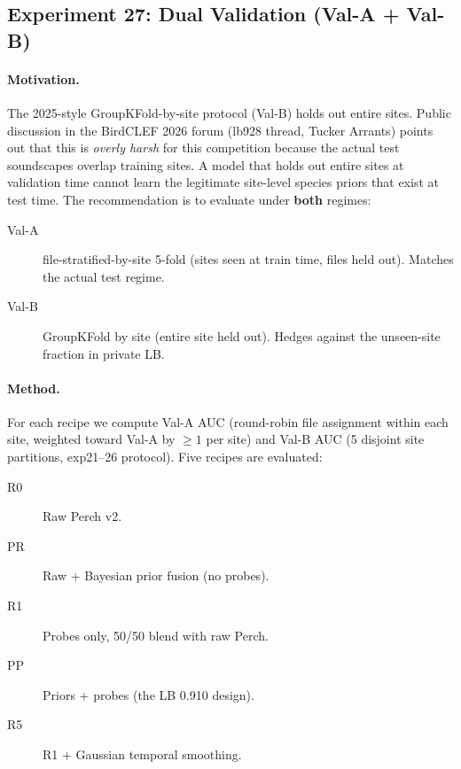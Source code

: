 \subsection{Experiment 27: Dual Validation (Val-A + Val-B)}
\label{sec:exp27}

\paragraph{Motivation.} The 2025-style GroupKFold-by-site protocol
(Val-B) holds out entire sites. Public discussion in the BirdCLEF
2026 forum (lb928 thread, Tucker Arrants) points out that this is
\textit{overly harsh} for this competition because the actual test
soundscapes overlap training sites. A model that holds out entire
sites at validation time cannot learn the legitimate site-level
species priors that exist at test time. The recommendation is to
evaluate under \textbf{both} regimes:
\begin{description}
\item[Val-A] file-stratified-by-site 5-fold (sites seen at train
time, files held out). Matches the actual test regime.
\item[Val-B] GroupKFold by site (entire site held out). Hedges
against the unseen-site fraction in private LB.
\end{description}

\paragraph{Method.} For each recipe we compute Val-A AUC (round-robin
file assignment within each site, weighted toward Val-A by $\geq{1}$
per site) and Val-B AUC (5 disjoint site partitions, exp21--26
protocol). Five recipes are evaluated:
\begin{description}
\item[R0] Raw Perch v2.
\item[PR] Raw + Bayesian prior fusion (no probes).
\item[R1] Probes only, 50/50 blend with raw Perch.
\item[PP] Priors + probes (the LB 0.910 design).
\item[R5] R1 + Gaussian temporal smoothing.
\end{description}


